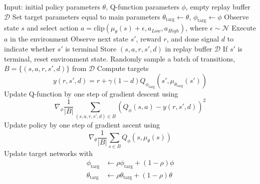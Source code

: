 \begin{algorithm}[H]
    \caption{Deep Deterministic Policy Gradient}
    \label{alg1}
\begin{algorithmic}[1]
    \STATE Input: initial policy parameters $\theta$, Q-function parameters $\phi$, empty replay buffer $\mathcal{D}$
    \STATE Set target parameters equal to main parameters $\theta_{\text{targ}} \leftarrow \theta$, $\phi_{\text{targ}} \leftarrow \phi$
    \REPEAT
        \STATE Observe state $s$ and select action $a = \text{clip}(\mu_{\theta}(s) + \epsilon, a_{Low}, a_{High})$, where $\epsilon \sim \mathcal{N}$
        \STATE Execute $a$ in the environment
        \STATE Observe next state $s'$, reward $r$, and done signal $d$ to indicate whether $s'$ is terminal
        \STATE Store $(s,a,r,s',d)$ in replay buffer $\mathcal{D}$
        \STATE If $s'$ is terminal, reset environment state.
                \STATE Randomly sample a batch of transitions, $B = \{ (s,a,r,s',d) \}$ from $\mathcal{D}$
                \STATE Compute targets
                \begin{equation*}
                    y(r,s',d) = r + \gamma (1-d) Q_{\phi_{\text{targ}}}(s', \mu_{\theta_{\text{targ}}}(s'))
                \end{equation*}
                \STATE Update Q-function by one step of gradient descent using
                \begin{equation*}
                    \nabla_{\phi} \frac{1}{|B|}\sum_{(s,a,r,s',d) \in B} \left( Q_{\phi}(s,a) - y(r,s',d) \right)^2
                \end{equation*}
                \STATE Update policy by one step of gradient ascent using
                \begin{equation*}
                    \nabla_{\theta} \frac{1}{|B|}\sum_{s \in B}Q_{\phi}(s, \mu_{\theta}(s))
                \end{equation*}
                \STATE Update target networks with
                \begin{align*}
                    \phi_{\text{targ}} &\leftarrow \rho \phi_{\text{targ}} + (1-\rho) \phi \\
                    \theta_{\text{targ}} &\leftarrow \rho \theta_{\text{targ}} + (1-\rho) \theta
                \end{align*}
            \ENDFOR
        \ENDIF
\end{algorithmic}
\end{algorithm}


